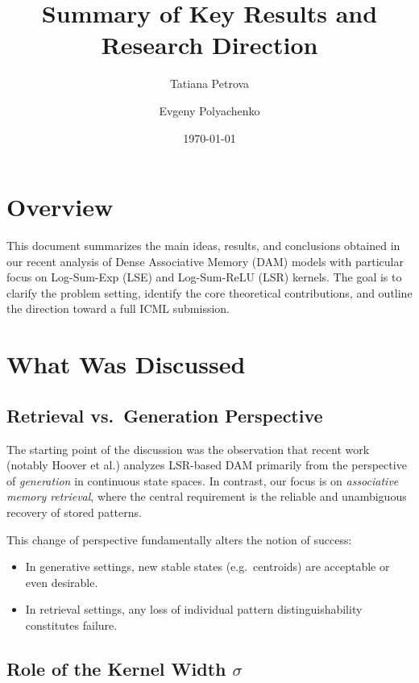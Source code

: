 \documentclass[11pt,a4paper]{article}
\title{Summary of Key Results and Research Direction}
\author{Tatiana Petrova \and Evgeny Polyachenko}
\date{\today}
\begin{document}
\maketitle

\section*{Overview}

This document summarizes the main ideas, results, and conclusions obtained in our recent analysis of Dense Associative Memory (DAM) models with particular focus on Log-Sum-Exp (LSE) and Log-Sum-ReLU (LSR) kernels. The goal is to clarify the problem setting, identify the core theoretical contributions, and outline the direction toward a full ICML submission.

\section{What Was Discussed}

\subsection{Retrieval vs.\ Generation Perspective}

The starting point of the discussion was the observation that recent work (notably Hoover et al.) analyzes LSR-based DAM primarily from the perspective of \emph{generation} in continuous state spaces. In contrast, our focus is on \emph{associative memory retrieval}, where the central requirement is the reliable and unambiguous recovery of stored patterns.

This change of perspective fundamentally alters the notion of success:
\begin{itemize}
    \item In generative settings, new stable states (e.g.\ centroids) are acceptable or even desirable.
    \item In retrieval settings, any loss of individual pattern distinguishability constitutes failure.
\end{itemize}

\subsection{Role of the Kernel Width $\sigma$}
\end{document}
